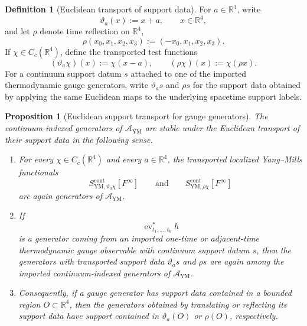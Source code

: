 \documentclass[11pt]{article}
\newtheorem{proposition}[theorem]{Proposition}
\theoremstyle{definition}
\newtheorem{definition}[theorem]{Definition}
\theoremstyle{remark}
\newcommand{\R}{\mathbb R}
\newcommand{\mcA}{\mathcal A}
\begin{document}
\begin{definition}[Euclidean transport of support data]
\label{def:support-transport}
For \(a\in\R^4\), write
\[
\vartheta_a(x):=x+a,
\qquad x\in\R^4,
\]
and let \(\rho\) denote time reflection on \(\R^4\),
\[
\rho(x_0,x_1,x_2,x_3):=(-x_0,x_1,x_2,x_3).
\]
If \(\chi\in C_c(\R^4)\), define the transported test functions
\[
(\vartheta_a\chi)(x):=\chi(x-a),
\qquad
(\rho\chi)(x):=\chi(\rho x).
\]
For a continuum support datum \(s\) attached to one of the imported
thermodynamic gauge generators, write \(\vartheta_a s\) and \(\rho s\) for the
support data obtained by applying the same Euclidean maps to the underlying
spacetime support labels.
\end{definition}

\begin{proposition}[Euclidean support transport for gauge generators]
\label{prop:support-transport}
The continuum-indexed generators of \(\mcA_{\mathrm{YM}}\) are stable under the
Euclidean transport of their support data in the following sense.
\begin{enumerate}[label=\textnormal{(\roman*)},leftmargin=1.5em]
\item For every \(\chi\in C_c(\R^4)\) and every \(a\in\R^4\), the transported
localized Yang--Mills functionals
\[
S_{\mathrm{YM},\vartheta_a\chi}^{\mathrm{cont}}[F^\infty]
\qquad\text{and}\qquad
S_{\mathrm{YM},\rho\chi}^{\mathrm{cont}}[F^\infty]
\]
are again generators of \(\mcA_{\mathrm{YM}}\).
\item If
\[
\operatorname{ev}_{t_1,\dots,t_k}^*h
\]
is a generator coming from an imported one-time or adjacent-time thermodynamic
gauge observable with continuum support datum \(s\), then the generators with
transported support data \(\vartheta_a s\) and \(\rho s\) are again among the
imported continuum-indexed generators of \(\mcA_{\mathrm{YM}}\).
\item Consequently, if a gauge generator has support data contained in a bounded
region \(O\subset\R^4\), then the generators obtained by translating or
reflecting its support data have support contained in \(\vartheta_a(O)\) or
\(\rho(O)\), respectively.
\end{enumerate}
\end{proposition}
\end{document}
